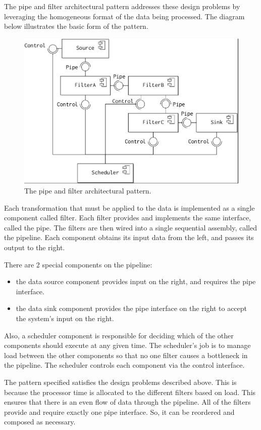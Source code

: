 \documentclass[a4paper, openany]{memoir}
\begin{document}
The pipe and filter architectural pattern addresses these design problems by leveraging the homogeneous format of the data being processed. The diagram below illustrates the basic form of the pattern.
\begin{figure}[H]
    \centering
    \includegraphics[scale=0.45]{src/14.12 pipe filter.png}
    \caption{The pipe and filter architectural pattern.}
\end{figure}
\noindent Each transformation that must be applied to the data is implemented as a single component called filter. Each filter provides and implements the same interface, called the pipe. The filters are then wired into a single sequential assembly, called the pipeline. Each component obtains its input data from the left, and passes its output to the right.

There are 2 special components on the pipeline:
\begin{itemize}
    \item the data source component provides input on the right, and requires the pipe interface.
    \item the data sink component provides the pipe interface on the right to accept the system's input on the right.
\end{itemize}
Also, a scheduler component is responsible for deciding which of the other components should execute at any given time. The scheduler's job is to manage load between the other components so that no one filter causes a bottleneck in the pipeline. The scheduler controls each component via the control interface.

The pattern specified satisfies the design problems described above. This is because the processor time is allocated to the different filters based on load. This ensures that there is an even flow of data through the pipeline. All of the filters provide and require exactly one pipe interface. So, it can be reordered and composed as necessary.
\end{document}
